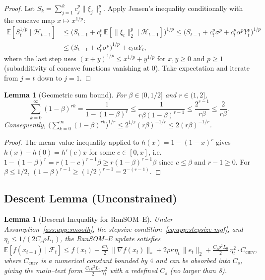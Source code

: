\documentclass{article}
\theoremstyle{plain}
\newtheorem{lemma}[theorem]{Lemma}
\theoremstyle{definition}
\theoremstyle{remark}
\begin{document}
\begin{proof}
Let $S_k = \sum_{j=1}^k c_j^p \|\xi_j\|_2^p$. Apply Jensen's inequality
conditionally with the concave map $x \mapsto x^{1/p}$:
\begin{align*}
  \mathbb{E}[S_t^{1/p} \mid \mathcal{H}_{t-1}]
  &\leq \bigl(S_{t-1} + c_t^p\, \mathbb{E}[\|\xi_t\|_2^p \mid \mathcal{H}_{t-1}]\bigr)^{1/p}
  \leq \bigl(S_{t-1} + c_t^p\sigma^p + c_t^p\alpha^p Y_t^p\bigr)^{1/p}
  \\
  &\leq \bigl(S_{t-1} + c_t^p\sigma^p\bigr)^{1/p} + c_t\alpha Y_t,
\end{align*}
where the last step uses $(x+y)^{1/p} \leq x^{1/p} + y^{1/p}$ for $x, y
\geq 0$ and $p \geq 1$ (subadditivity of concave functions vanishing at
$0$). Take expectation and iterate from $j = t$ down to $j = 1$.
\end{proof}

\begin{lemma}[Geometric sum bound]
\label{lem:app:geom}
For $\beta \in (0, 1/2]$ and $r \in (1, 2]$,
\[
  \sum_{k=0}^\infty (1-\beta)^{rk}
  = \frac{1}{1 - (1-\beta)^r}
  \leq \frac{1}{r\beta(1-\beta)^{r-1}}
  \leq \frac{2^{r-1}}{r\beta}
  \leq \frac{2}{r\beta}.
\]
Consequently, $\bigl(\sum_{k=0}^\infty (1-\beta)^{rk}\bigr)^{1/r} \leq
2^{1/r}(r\beta)^{-1/r} \leq 2(r\beta)^{-1/r}$.
\end{lemma}

\begin{proof}
The mean--value inequality applied to $h(x) = 1 - (1-x)^r$ gives $h(x) -
h(0) = h'(c) x$ for some $c \in [0, x]$, i.e. $1 - (1-\beta)^r =
r(1-c)^{r-1}\beta \geq r(1-\beta)^{r-1}\beta$ since $c \leq \beta$ and
$r-1 \geq 0$. For $\beta \leq 1/2$, $(1-\beta)^{r-1} \geq (1/2)^{r-1} =
2^{-(r-1)}$.
\end{proof}


\subsection{Descent Lemma (Unconstrained)}
\label{app:descent-e}

\begin{lemma}[Descent Inequality for RanSOM--E]
\label{lem:app:descent}
Under Assumption~\ref{ass:app:smooth}, the stepsize
condition~\eqref{eq:app:stepsize-mgf}, and
$\eta_t \leq 1/(2 C_s \rho L_1)$, the RanSOM--E update satisfies
\begin{equation}
  \mathbb{E}[f(x_{t+1}) \mid \mathcal{F}_t]
  \leq f(x_t)
    - \tfrac{\rho \eta_t}{2}\, \|\nabla f(x_t)\|_*
    + 2\rho \kappa \eta_t\, \|e_t\|_2
    + \tfrac{C_s \rho^2 L_0}{2}\, \eta_t^2\cdot C_{\mathrm{curv}},
  \label{eq:app:descent}
\end{equation}
where $C_{\mathrm{curv}}$ is a numerical constant bounded by $4$ and can
be absorbed into $C_s$, giving the main--text form $\tfrac{C_s\rho^2
L_0}{2}\eta_t^2$ with a redefined $C_s$ (no larger than 8).
\end{lemma}
\end{document}
